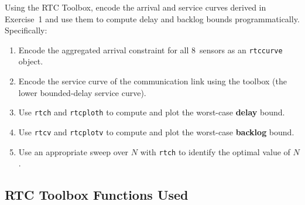 \documentclass[12pt, a4paper]{article}
\begin{document}
Using the RTC Toolbox, encode the arrival and service curves derived in Exercise~1
and use them to compute delay and backlog bounds programmatically.
Specifically:

\begin{enumerate}[leftmargin=1.6em, itemsep=4pt]
  \item Encode the aggregated arrival constraint for all 8~sensors as an
    \texttt{rtccurve} object.
  \item Encode the service curve of the communication link using the
    toolbox (the lower bounded-delay service curve).
  \item Use \texttt{rtch} and \texttt{rtcploth} to compute and plot the
    worst-case \textbf{delay} bound.
  \item Use \texttt{rtcv} and \texttt{rtcplotv} to compute and plot the
    worst-case \textbf{backlog} bound.
  \item Use an appropriate sweep over $N$ with \texttt{rtch} to identify the
    optimal value of $N$.
\end{enumerate}

\subsection*{RTC Toolbox Functions Used}
\end{document}
